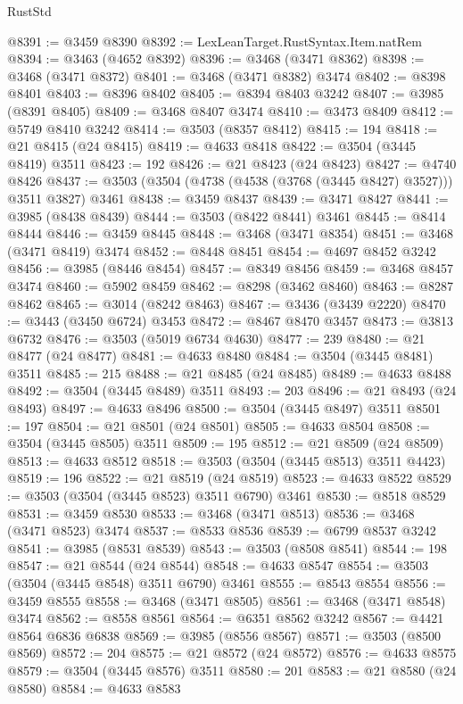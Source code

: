 \begin{lexlean}{RustStd}
\begin{coremodule}
@8391 := @3459 @8390
@8392 := LexLeanTarget.RustSyntax.Item.natRem
@8394 := @3463 (@4652 @8392)
@8396 := @3468 (@3471 @8362)
@8398 := @3468 (@3471 @8372)
@8401 := @3468 (@3471 @8382) @3474
@8402 := @8398 @8401
@8403 := @8396 @8402
@8405 := @8394 @8403 @3242
@8407 := @3985 (@8391 @8405)
@8409 := @3468 @8407 @3474
@8410 := @3473 @8409
@8412 := @5749 @8410 @3242
@8414 := @3503 (@8357 @8412)
@8415 := 194
@8418 := @21 @8415 (@24 @8415)
@8419 := @4633 @8418
@8422 := @3504 (@3445 @8419) @3511
@8423 := 192
@8426 := @21 @8423 (@24 @8423)
@8427 := @4740 @8426
@8437 := @3503 (@3504 (@4738 (@4538 (@3768 (@3445 @8427) @3527))) @3511 @3827) @3461
@8438 := @3459 @8437
@8439 := @3471 @8427
@8441 := @3985 (@8438 @8439)
@8444 := @3503 (@8422 @8441) @3461
@8445 := @8414 @8444
@8446 := @3459 @8445
@8448 := @3468 (@3471 @8354)
@8451 := @3468 (@3471 @8419) @3474
@8452 := @8448 @8451
@8454 := @4697 @8452 @3242
@8456 := @3985 (@8446 @8454)
@8457 := @8349 @8456
@8459 := @3468 @8457 @3474
@8460 := @5902 @8459
@8462 := @8298 (@3462 @8460)
@8463 := @8287 @8462
@8465 := @3014 (@8242 @8463)
@8467 := @3436 (@3439 @2220)
@8470 := @3443 (@3450 @6724) @3453
@8472 := @8467 @8470 @3457
@8473 := @3813 @6732
@8476 := @3503 (@5019 @6734 @4630)
@8477 := 239
@8480 := @21 @8477 (@24 @8477)
@8481 := @4633 @8480
@8484 := @3504 (@3445 @8481) @3511
@8485 := 215
@8488 := @21 @8485 (@24 @8485)
@8489 := @4633 @8488
@8492 := @3504 (@3445 @8489) @3511
@8493 := 203
@8496 := @21 @8493 (@24 @8493)
@8497 := @4633 @8496
@8500 := @3504 (@3445 @8497) @3511
@8501 := 197
@8504 := @21 @8501 (@24 @8501)
@8505 := @4633 @8504
@8508 := @3504 (@3445 @8505) @3511
@8509 := 195
@8512 := @21 @8509 (@24 @8509)
@8513 := @4633 @8512
@8518 := @3503 (@3504 (@3445 @8513) @3511 @4423)
@8519 := 196
@8522 := @21 @8519 (@24 @8519)
@8523 := @4633 @8522
@8529 := @3503 (@3504 (@3445 @8523) @3511 @6790) @3461
@8530 := @8518 @8529
@8531 := @3459 @8530
@8533 := @3468 (@3471 @8513)
@8536 := @3468 (@3471 @8523) @3474
@8537 := @8533 @8536
@8539 := @6799 @8537 @3242
@8541 := @3985 (@8531 @8539)
@8543 := @3503 (@8508 @8541)
@8544 := 198
@8547 := @21 @8544 (@24 @8544)
@8548 := @4633 @8547
@8554 := @3503 (@3504 (@3445 @8548) @3511 @6790) @3461
@8555 := @8543 @8554
@8556 := @3459 @8555
@8558 := @3468 (@3471 @8505)
@8561 := @3468 (@3471 @8548) @3474
@8562 := @8558 @8561
@8564 := @6351 @8562 @3242
@8567 := @4421 @8564 @6836 @6838
@8569 := @3985 (@8556 @8567)
@8571 := @3503 (@8500 @8569)
@8572 := 204
@8575 := @21 @8572 (@24 @8572)
@8576 := @4633 @8575
@8579 := @3504 (@3445 @8576) @3511
@8580 := 201
@8583 := @21 @8580 (@24 @8580)
@8584 := @4633 @8583

\end{coremodule}
\end{lexlean}

